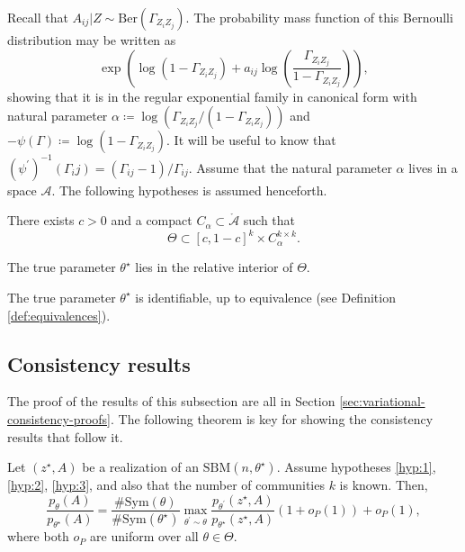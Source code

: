 \documentclass[../../main.tex]{subfiles} %
\begin{document}
Recall that \(A_{ij} \vert Z \sim \text{Ber}(\Gamma_{Z_i Z_j})\). The probability 
mass function of this Bernoulli distribution may be written as
\begin{equation*}
	\exp{\left(\log(1 - \Gamma_{Z_i Z_j}) + a_{ij} \log \left(\frac{\Gamma_{Z_i 
				Z_j}}{1 
			- \Gamma_{Z_i Z_j}}\right)\right)},
\end{equation*}
showing that it is in the regular exponential family in canonical form with 
natural parameter \(\alpha \coloneqq \log(\Gamma_{Z_i Z_j} / (1 - 
\Gamma_{Z_i Z_j}))\) and \(-\psi(\Gamma) \coloneqq \log (1 - \Gamma_{Z_i 
	Z_j})\). It will be useful to know that \((\psi^\prime)^{-1}(\Gamma_ij) = 
(\Gamma_{ij} - 1)/\Gamma_{ij}\). Assume that the natural parameter \(\alpha\) 
lives in a space \(\mathcal 
A\). The following hypotheses is assumed henceforth.
\begin{hypothesis}
	There exists \(c > 0\) and a compact \(C_{\alpha} \subset 
	\mathring{\mathcal{A}}\) such that
	\begin{equation*}
		\Theta \subset [c, 1-c]^k \times C_{\alpha}^{k \times k}.
	\end{equation*}
	\label{hyp:1}
\end{hypothesis}

\begin{hypothesis}
	The true parameter \(\theta^\star\) lies in the relative interior of \(\Theta\).
	\label{hyp:2}
\end{hypothesis}

\begin{hypothesis}[On identifiability]
	The true parameter \(\theta^\star\) is identifiable, up to equivalence (see 
	Definition \ref{def:equivalences}).
	\label{hyp:3}
\end{hypothesis}

\subsection{Consistency results}
The proof of the results of this subsection are all in Section 
\ref{sec:variational-consistency-proofs}. The following theorem is key for showing 
the 
consistency results that follow it.
\begin{theorem}
	Let \((z^\star, A)\) be a realization of an \(\text{SBM}(n, \theta^\star)\). 
	Assume hypotheses \ref{hyp:1}, \ref{hyp:2}, \ref{hyp:3}, and also that the 
	number of communities \(k\) is known. Then,
	\begin{equation}
		\frac{p_\theta(A)}{p_{\theta^\star}(A)} = 
		\frac{\text{\#Sym}(\theta)}{\text{\#Sym}(\theta^\star)} 
		\max_{\theta^\prime \sim \theta} \frac{p_{\theta^\prime}( 
			z^\star, A)}{p_{\theta^\star}(z^\star, A)} (1 + o_P (1)) + o_P(1),
	\end{equation}
	where both \(o_P\) are uniform over all \(\theta \in \Theta\).
	\label{thm:main-result}
\end{theorem}
\end{document}
